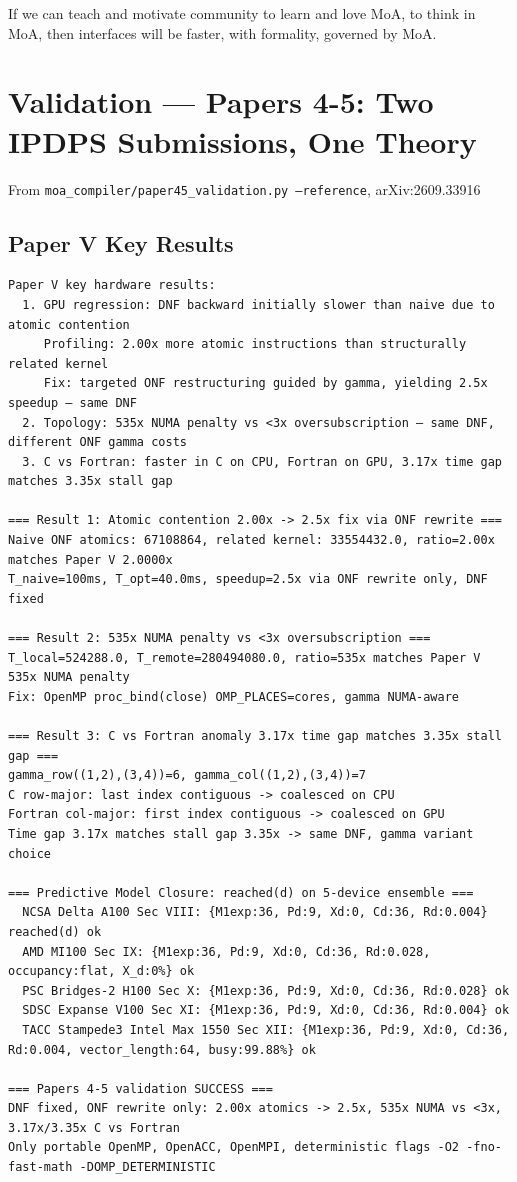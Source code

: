 \documentclass[11pt]{article}
\begin{document}
If we can teach and motivate community to learn and love MoA, to think in MoA, then interfaces will be faster, with formality, governed by MoA.

\section{Validation — Papers 4-5: Two IPDPS Submissions, One Theory}
From {\tt moa\_compiler/paper45\_validation.py --reference}, arXiv:2609.33916

\subsection{Paper V Key Results}
\begin{lstlisting}
Paper V key hardware results:
  1. GPU regression: DNF backward initially slower than naive due to atomic contention
     Profiling: 2.00x more atomic instructions than structurally related kernel
     Fix: targeted ONF restructuring guided by gamma, yielding 2.5x speedup — same DNF
  2. Topology: 535x NUMA penalty vs <3x oversubscription — same DNF, different ONF gamma costs
  3. C vs Fortran: faster in C on CPU, Fortran on GPU, 3.17x time gap matches 3.35x stall gap

=== Result 1: Atomic contention 2.00x -> 2.5x fix via ONF rewrite ===
Naive ONF atomics: 67108864, related kernel: 33554432.0, ratio=2.00x matches Paper V 2.0000x
T_naive=100ms, T_opt=40.0ms, speedup=2.5x via ONF rewrite only, DNF fixed

=== Result 2: 535x NUMA penalty vs <3x oversubscription ===
T_local=524288.0, T_remote=280494080.0, ratio=535x matches Paper V 535x NUMA penalty
Fix: OpenMP proc_bind(close) OMP_PLACES=cores, gamma NUMA-aware

=== Result 3: C vs Fortran anomaly 3.17x time gap matches 3.35x stall gap ===
gamma_row((1,2),(3,4))=6, gamma_col((1,2),(3,4))=7
C row-major: last index contiguous -> coalesced on CPU
Fortran col-major: first index contiguous -> coalesced on GPU
Time gap 3.17x matches stall gap 3.35x -> same DNF, gamma variant choice

=== Predictive Model Closure: reached(d) on 5-device ensemble ===
  NCSA Delta A100 Sec VIII: {M1exp:36, Pd:9, Xd:0, Cd:36, Rd:0.004} reached(d) ok
  AMD MI100 Sec IX: {M1exp:36, Pd:9, Xd:0, Cd:36, Rd:0.028, occupancy:flat, X_d:0%} ok
  PSC Bridges-2 H100 Sec X: {M1exp:36, Pd:9, Xd:0, Cd:36, Rd:0.028} ok
  SDSC Expanse V100 Sec XI: {M1exp:36, Pd:9, Xd:0, Cd:36, Rd:0.004} ok
  TACC Stampede3 Intel Max 1550 Sec XII: {M1exp:36, Pd:9, Xd:0, Cd:36, Rd:0.004, vector_length:64, busy:99.88%} ok

=== Papers 4-5 validation SUCCESS ===
DNF fixed, ONF rewrite only: 2.00x atomics -> 2.5x, 535x NUMA vs <3x, 3.17x/3.35x C vs Fortran
Only portable OpenMP, OpenACC, OpenMPI, deterministic flags -O2 -fno-fast-math -DOMP_DETERMINISTIC
\end{lstlisting}
\end{document}
